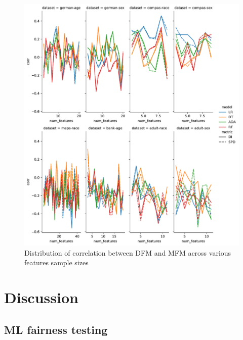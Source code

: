 \documentclass{article}
\begin{document}
\begin{figure}
  \centering
  \includegraphics[width=0.95\linewidth]{lineplot--num-features--corr.pdf}
  \caption{Distribution of correlation between DFM and MFM across
    various features sample sizes}
  \label{fig:lineplot--num-features--corr}
\end{figure}

\section{Discussion}\label{sec:discuss}

\subsection{ML fairness testing}\label{sec:discuss-ml-fair-test}


\end{document}
